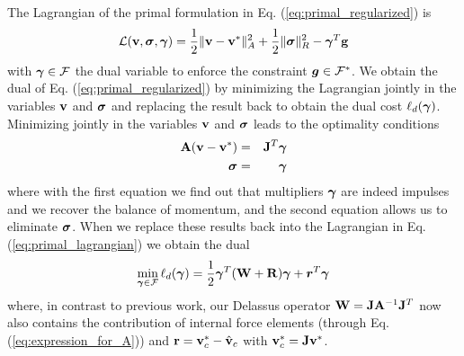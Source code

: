 \begin{IEEEproof}
The Lagrangian of the primal formulation in Eq. (\ref{eq:primal_regularized}) is
\begin{equation}
	\mathcal{L}(\mf{v},\bsigma,\vf{\gamma}) = 
	\frac{1}{2}\Vert\mf{v}-\mf{v}^*\Vert_A^2 + \frac{1}{2} \Vert\bsigma\Vert_{R}^2 - \vf{\gamma}^T\mf{g}
	\label{eq:primal_lagrangian}
\end{equation}
with ${\bm{\gamma}}\in\mathcal{F}$ the dual variable to enforce the constraint
${\bm{g}}\in \mathcal{F}^*$. We obtain the dual of Eq.
(\ref{eq:primal_regularized}) by minimizing the Lagrangian jointly in the
variables ${\mathbf{v}}$ and ${\bm\sigma}$ and replacing the result back to obtain the
dual cost $\ell_d({\bm{\gamma}})$. Minimizing jointly in the variables ${\mathbf{v}}$
and ${\bm\sigma}$ leads to the optimality conditions
\begin{eqnarray}
	\mf{A}(\mf{v}-\mf{v}^*) &=& \mf{J}^T\vf{\gamma}\nonumber\\
	\vf{\sigma} &=& \vf{\gamma}
	\label{eq:primal_optimality_conditions}
\end{eqnarray}
where with the first equation we find out that multipliers ${\bm\gamma}$ are indeed
impulses and we recover the balance of momentum, and the second equation allows
us to eliminate ${\bm{\sigma}}$. When we replace these results back into the
Lagrangian in Eq. (\ref{eq:primal_lagrangian}) we obtain the dual
\begin{eqnarray}
	\min_{{\bm\gamma}\in \mathcal{F}} \ell_d({\bm\gamma}) =
	\frac{1}{2}{\bm\gamma}^T(\mathbf{W}+\mathbf{R}){\bm\gamma} + {\bm r}^T
	{\bm\gamma}
\end{eqnarray}
where, in contrast to previous work, our Delassus operator
${\mathbf{W}}={\mathbf{J}}{\mathbf{A}}^{-1}{\mathbf{J}}^T$ now also contains the contribution of internal
force elements (through Eq. (\ref{eq:expression_for_A})) and
${\mathbf{r}}={\mathbf{v}}_c^*-\hat{{\mathbf{v}}}_c$ with ${\mathbf{v}}_c^*={\mathbf{J}}{\mathbf{v}}^*$.
\end{IEEEproof}


